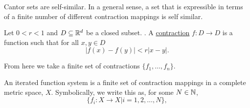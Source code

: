 





Cantor sets are self-similar.  In a general sense, a set that is expressible in terms of a finite number of different contraction mappings is self similar.  

\begin{definition}
    Let $0< r <1$ and $D \subseteq \mathbb{R}^d$ be a closed subset.  .  A \underline{contraction} $f: D \to D$ is a function such that for all $x,y \in D$ $$\vert f(x) - f(y) \vert < r\vert x - y \vert.$$ 
\end{definition}

From here we take a finite set of contractions $\{f_1, \dots, f_n\}.$    

\begin{definition}
    An iterated function system is a finite set of contraction mappings in a complete metric space, $X$.  Symbolically, we write this as, for some $N \in \mathbb{N}$,
    $$\{f_i:X \to X \vert i = 1,2,\dots, N\}, $$
\end{definition}

